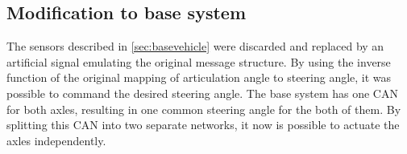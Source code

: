 \documentclass[root.tex]{subfiles}
\begin{document}
\subsection{Modification to base system}
The sensors described in \ref{sec:basevehicle} were discarded and replaced by an artificial signal emulating the original message structure. By using the inverse  function of the original mapping of articulation angle to steering angle, it was possible to command the desired steering angle. The base system has one \gls{CAN} for both axles, resulting in one common steering angle for the both of them. By splitting this \gls{CAN} into two separate networks, it now is possible to actuate the axles independently. 
\end{document}
